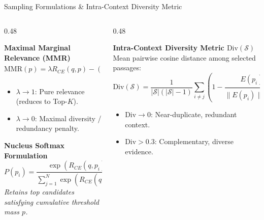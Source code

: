 \documentclass[10pt,aspectratio=169]{beamer}
\begin{document}
\begin{frame}{Sampling Formulations \& Intra-Context Diversity Metric}
    \begin{columns}[onlytextwidth,T]
        \begin{column}{0.48\textwidth}
            \begin{block}{\textbf{Maximal Marginal Relevance (MMR)}}
                \scriptsize
                $$\text{MMR}(p) = \lambda R_{CE}(q, p) - (1 - \lambda) \max_{p_j \in \mathcal{S}} \cos(E(p), E(p_j))$$
                \begin{itemize}\setlength\itemsep{1pt}
                    \item $\lambda \to 1$: Pure relevance (reduces to Top-$K$).
                    \item $\lambda \to 0$: Maximal diversity / redundancy penalty.
                \end{itemize}
            \end{block}
            
            \vspace{0.1cm}
            \begin{block}{\textbf{Nucleus Softmax Formulation}}
                \scriptsize
                $$P(p_i) = \frac{\exp(R_{CE}(q, p_i) / \tau)}{\sum_{j=1}^N \exp(R_{CE}(q, p_j) / \tau)}$$
                \textit{Retains top candidates satisfying cumulative threshold mass $p$.}
            \end{block}
        \end{column}
        
        \begin{column}{0.48\textwidth}
            \begin{alertblock}{\textbf{Intra-Context Diversity Metric $\text{Div}(\mathcal{S})$}}
                \scriptsize
                Mean pairwise cosine distance among selected passages:
                $$\text{Div}(\mathcal{S}) = \frac{1}{|\mathcal{S}|(|\mathcal{S}|-1)} \sum_{i \ne j} \left( 1 - \frac{E(p_i) \cdot E(p_j)}{\|E(p_i)\|_2 \|E(p_j)\|_2} \right)$$
                \begin{itemize}\setlength\itemsep{1pt}
                    \item $\text{Div} \to 0$: Near-duplicate, redundant context.
                    \item $\text{Div} > 0.3$: Complementary, diverse evidence.
                \end{itemize}
            \end{alertblock}
            

\end{column}
\end{columns}
\end{frame}
\end{document}
